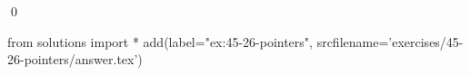 
\begin{ex}
  \label{ex:45-26-pointers}
  
  \qed
\end{ex}
\begin{python0}
from solutions import *
add(label="ex:45-26-pointers",
    srcfilename='exercises/45-26-pointers/answer.tex')
\end{python0}
